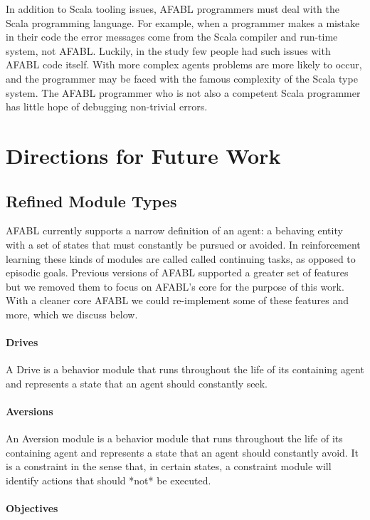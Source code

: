 In addition to Scala tooling issues, AFABL programmers must deal with the Scala programming language. For example, when a programmer makes a mistake in their code the error messages come from the Scala compiler and run-time system, not AFABL. Luckily, in the study few people had such issues with AFABL code itself. With more complex agents problems are more likely to occur, and the programmer may be faced with the famous complexity of the Scala type system. The AFABL programmer who is not also a competent Scala programmer has little hope of debugging non-trivial errors.

\section{Directions for Future Work}


\subsection{Refined Module Types}

AFABL currently supports a narrow definition of an agent: a behaving entity with a set of states that must constantly be pursued or avoided. In reinforcement learning these kinds of modules are called called continuing tasks, as opposed to episodic goals. Previous versions of AFABL supported a greater set of features but we removed them to focus on AFABL's core for the purpose of this work. With a cleaner core AFABL we could re-implement some of these features and more, which we discuss below.

\paragraph{Drives}

A Drive is a behavior module that runs throughout the life of its containing agent and represents a state that an agent should constantly seek.

\paragraph{Aversions}

An Aversion module is a behavior module that runs throughout the life of its containing agent and represents a state that an agent should constantly avoid.  It is a constraint in the sense that, in certain states, a constraint module will identify actions that should *not* be executed.

\paragraph{Objectives}

